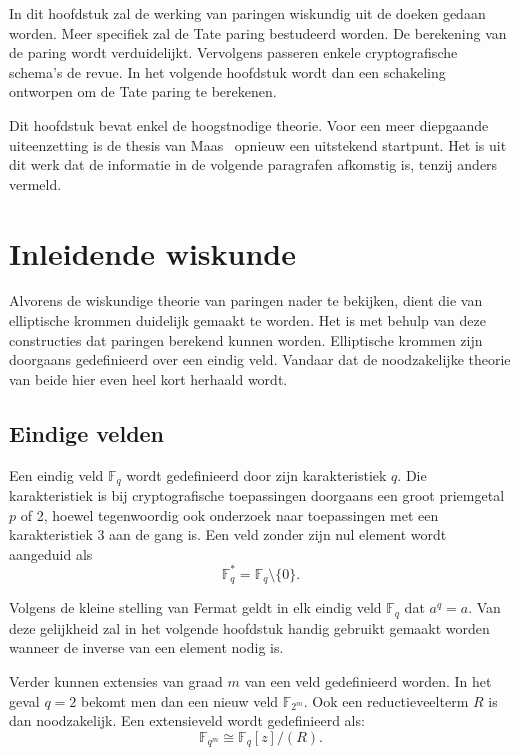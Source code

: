 
In dit hoofdstuk zal de werking van paringen wiskundig uit de doeken gedaan worden. Meer specifiek zal de Tate paring bestudeerd worden. De berekening van de paring wordt verduidelijkt. Vervolgens passeren enkele cryptografische schema's de revue. In het volgende hoofdstuk wordt dan een schakeling ontworpen om de Tate paring te berekenen.

Dit hoofdstuk bevat enkel de hoogstnodige theorie. Voor een meer diepgaande uiteenzetting is de thesis van Maas~\cite{maas} opnieuw een uitstekend startpunt. Het is uit dit werk dat de informatie in de volgende paragrafen afkomstig is, tenzij anders vermeld.

\section{Inleidende wiskunde}

Alvorens de wiskundige theorie van paringen nader te bekijken, dient die van elliptische krommen duidelijk gemaakt te worden. Het is met behulp van deze constructies dat paringen berekend kunnen worden. Elliptische krommen zijn doorgaans gedefinieerd over een eindig veld. Vandaar dat de noodzakelijke theorie van beide hier even heel kort herhaald wordt.

\subsection{Eindige velden}

Een eindig veld $\mathbb{F}_q$ wordt gedefinieerd door zijn karakteristiek $q$. Die karakteristiek is bij cryptografische toepassingen doorgaans een groot priemgetal $p$ of 2, hoewel tegenwoordig ook onderzoek naar toepassingen met een karakteristiek 3 aan de gang is. Een veld zonder zijn nul element wordt aangeduid als
\[\mathbb{F}_q^* = \mathbb{F}_q \setminus \{ 0 \}.\]

Volgens de kleine stelling van Fermat geldt in elk eindig veld $\mathbb{F}_q$ dat $a^q = a$. Van deze gelijkheid zal in het volgende hoofdstuk handig gebruikt gemaakt worden wanneer de inverse van een element nodig is.

Verder kunnen extensies van graad $m$ van een veld gedefinieerd worden. In het geval $q = 2$ bekomt men dan een nieuw veld $\mathbb{F}_{2^m}$. Ook een reductieveelterm $R$ is dan noodzakelijk. Een extensieveld wordt gedefinieerd als:
\[\mathbb{F}_{q^m} \cong \mathbb{F}_q [z] / (R). \]


